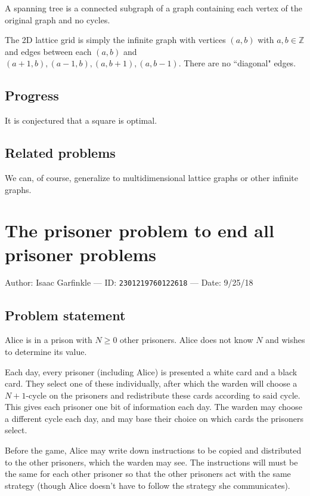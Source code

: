 \documentclass[10pt]{article}
\begin{document}
A spanning tree is a connected subgraph of a graph containing each vertex of the original graph and no cycles.

The 2D lattice grid is simply the infinite graph with vertices $(a,b)$ with $a,b\in\mathbb{Z}$ and edges between each $(a,b)$ and $(a+1,b),(a-1,b),(a,b+1),(a,b-1)$. There are no ``diagonal" edges.

\subsection{Progress}

It is conjectured that a square is optimal.

\subsection{Related problems}

We can, of course, generalize to multidimensional lattice graphs or other infinite graphs.

\pagebreak

\section{The prisoner problem to end all prisoner problems}

Author: Isaac Garfinkle --- ID: \verb`2301219760122618` --- Date: 9/25/18

\subsection{Problem statement}

Alice is in a prison with $N\geq0$ other prisoners. Alice does not know $N$ and wishes to determine its value.

Each day, every prisoner (including Alice) is presented a white card and a black card. They select one of these individually, after which the warden will choose a $N+1$-cycle on the prisoners and redistribute these cards according to said cycle. This gives each prisoner one bit of information each day. The warden may choose a different cycle each day, and may base their choice on which cards the prisoners select.

Before the game, Alice may write down instructions to be copied and distributed to the other prisoners, which the warden may see. The instructions will must be the same for each other prisoner so that the other prisoners act with the same strategy (though Alice doesn't have to follow the strategy she communicates).
\end{document}
